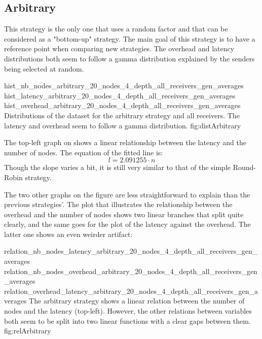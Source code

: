 \FloatBarrier
\subsection{Arbitrary}
\label{ssec:arbitrary}
This strategy is the only one that uses a random factor and that can be
considered as a "bottom-up" strategy. The main goal of this strategy is to
have a reference point when comparing new strategies.
The overhead and latency distributions both seem to follow a gamma distribution
explained by the senders being selected at random.

\triplefigure
    {hist_nb_nodes_arbitrary_20_nodes_4_depth_all_receivers_gen_averages}
    {hist_latency_arbitrary_20_nodes_4_depth_all_receivers_gen_averages}
    {hist_overhead_arbitrary_20_nodes_4_depth_all_receivers_gen_averages}
    {Distributions of the dataset for the arbitrary strategy and all
    receivers. The latency and overhead seem to follow a gamma distribution. }
    {fig:distArbitrary}

The top-left graph on  shows a linear relationship
between the latency and the number of nodes. The equation of the fitted line is:
\[l = 2.091255 \cdot n\]
Though the slope varies a bit, it is still very similar to that of the simple
Round-Robin strategy.

The two other graphs on the figure are less straightforward to explain than the
previous strategies'. The plot that illustrates the relationship between the
overhead and the number of nodes shows two linear branches that split quite
clearly, and the same goes for the plot of the latency against the overhead.
The latter one shows an even weirder artifact: 

\triplefigure
    {relation_nb_nodes_latency_arbitrary_20_nodes_4_depth_all_receivers_gen_averages}
    {relation_nb_nodes_overhead_arbitrary_20_nodes_4_depth_all_receivers_gen_averages}
    {relation_overhead_latency_arbitrary_20_nodes_4_depth_all_receivers_gen_averages}
    {The arbitrary strategy shows a linear relation between the number of
    nodes and the latency (top-left). However, the other relations between
    variables both seem to be split into two linear functions with a clear gaps
    between them.}
    {fig:relArbitrary}

